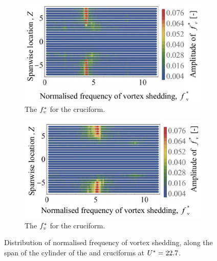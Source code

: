 \documentclass[oneside]{utmthesis}
\begin{document}
\begin{figure}
  \centering

  \begin{subfigure}[h]{0.46\textwidth}
    \includegraphics[width=\textwidth]{figs/probe675YU10}
    \caption{The $f^{*}_{v}$ for the \angfo{} cruciform.}
    \label{fig:probe675YU10}
  \end{subfigure}
  \hspace{6mm}
  \begin{subfigure}[h]{0.46\textwidth}
    \includegraphics[width=\textwidth]{figs/probe45YU10}
    \caption{The $f^{*}_{v}$ for the \angth{} cruciform.}
    \label{fig:probe45YU10}
  \end{subfigure}

  \caption{Distribution of normalised frequency of vortex shedding, along the span of the cylinder of the \angfo{} and \angth{} cruciforms at $U^{*} = 22.7$.}
  \label{fig:probe67545YU10}
\end{figure}
\end{document}
